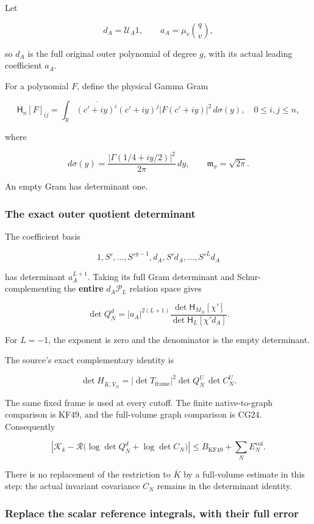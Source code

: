 \documentclass[11pt]{article}
\begin{document}
Let

\[
d_A=\mathcal U_A1,\qquad
a_A=\mu_v\binom qv,
\]

so \(d_A\) is the full original outer polynomial of degree \(g\), with its actual leading coefficient \(a_A\).

For a polynomial \(F\), define the physical Gamma Gram

\[
\mathsf H_n[F]_{ij}
=
\int_{\mathbb R}
\overline{(c'+iy)^i}(c'+iy)^j
|F(c'+iy)|^2\,d\sigma(y),
\quad 0\le i,j\le n,
\tag{5}
\]

where

\[
d\sigma(y)=
\frac{|\Gamma(1/4+iy/2)|^2}{2\pi}\,dy,
\qquad
\mathfrak m_\sigma=\sqrt{2\pi}.
\]

An empty Gram has determinant one.

\subsubsection{The exact outer quotient determinant}\label{the-exact-outer-quotient-determinant}

The coefficient basis

\[
1,S',\ldots,S'^{g-1},
d_A,S'd_A,\ldots,S'^Ld_A
\]

has determinant \(a_A^{L+1}\). Taking its full Gram determinant and Schur-complementing the \textbf{entire} \(d_A\mathcal P_L\) relation space gives

\[
\boxed{
\det Q_N^d
=
|a_A|^{2(L+1)}
\frac{\det\mathsf H_{M_N}[\chi']}
{\det\mathsf H_L[\chi'd_A]}.
}
\tag{6}
\]

For \(L=-1\), the exponent is zero and the denominator is the empty determinant.

The source's exact complementary identity is

\[
\det H_{\overline K,Y_N}
=
|\det T_{\mathrm{frame}}|^2
\det Q_N^U\,\det C_N^U.
\]

The same fixed frame is used at every cutoff. The finite native-to-graph comparison is KF49, and the full-volume graph comparison is CG24. Consequently

\[
\boxed{
\left|
\mathcal K_k-
\mathcal R\bigl(\log\det Q_N^d+\log\det C_N\bigr)
\right|
\le
B_{\mathrm{KF49}}+\sum_NE_N^{\mathrm{vol}}.
}
\tag{7}
\]

There is no replacement of the restriction to \(\overline K\) by a full-volume estimate in this step: the actual invariant covariance \(C_N\) remains in the determinant identity.

\subsubsection{Replace the scalar reference integrals, with their full error}\label{replace-the-scalar-reference-integrals-with-their-full-error}
\end{document}
